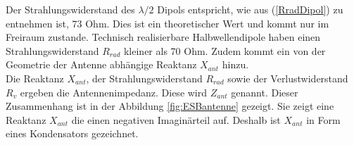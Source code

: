 Der Strahlungswiderstand des $\lambda/2$ Dipols entspricht, wie aus (\ref{RradDipol}) zu entnehmen ist, 73 Ohm. Dies ist ein theoretischer Wert und kommt nur im Freiraum zustande. Technisch realisierbare Halbwellendipole haben einen Strahlungswiderstand $R_{rad}$ kleiner als 70 Ohm. Zudem kommt ein von der Geometrie der Antenne abhängige Reaktanz $X_{ant}$ hinzu.\\
Die Reaktanz $X_{ant}$, der Strahlungswiderstand $R_{rad}$ sowie der Verlustwiderstand $R_v$ ergeben die Antennenimpedanz. Diese wird $Z_{ant}$ genannt. Dieser Zusammenhang ist in der Abbildung \ref{fig:ESBantenne} gezeigt. Sie zeigt eine Reaktanz $X_{ant}$ die einen negativen Imaginärteil auf. Deshalb ist $X_{ant}$ in Form eines Kondensators gezeichnet.

